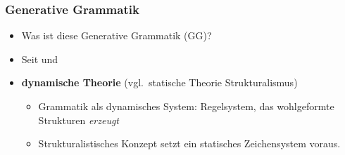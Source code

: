 %
%
%
%
%	
%




	
		





\begin{frame}
\frametitle{Generative Grammatik}

\begin{itemize}
	\item Was ist diese Generative Grammatik (GG)? 
	\medskip
	\item Seit \citet{Chomsky57x} und \citet{Chomsky65a}
	\medskip
	\item \textbf{dynamische Theorie} (vgl.\ statische Theorie \ras \zB Strukturalismus)
	\begin{itemize}
		\item Grammatik als dynamisches System: Regelsystem, das wohlgeformte Strukturen \emph{erzeugt}
		\medskip
		\item Strukturalistisches Konzept  setzt ein statisches Zeichensystem voraus. 
	\end{itemize}

\end{itemize}

\end{frame}


